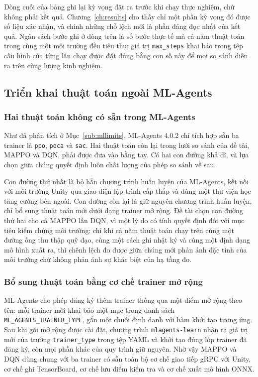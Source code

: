 \indent Dòng cuối của bảng ghi lại kỳ vọng đặt ra trước khi chạy thực nghiệm, chứ không
phải kết quả. Chương~\ref{ch:results} cho thấy chỉ một phần kỳ vọng đó được số liệu
xác nhận, và chính những chỗ lệch mới là phần đáng đọc nhất của kết quả. Ngân sách bước
ghi ở dòng trên là số bước thực tế mà cả năm thuật toán trong cùng một môi trường đều
tiêu thụ; giá trị \texttt{max\_steps} khai báo trong tệp cấu hình của từng lần chạy
được đặt đúng bằng con số này để mọi so sánh diễn ra trên cùng lượng kinh nghiệm.

\subsection{Triển khai thuật toán ngoài ML-Agents}
\label{sub:custom}

\subsubsection{Hai thuật toán không có sẵn trong ML-Agents}
\indent Như đã phân tích ở Mục~\ref{sub:mllimits}, ML-Agents 4.0.2 chỉ tích hợp sẵn ba
trainer là \texttt{ppo}, \texttt{poca} và \texttt{sac}. Hai thuật toán còn lại trong
lưới so sánh của đề tài, MAPPO và DQN, phải được đưa vào bằng tay. Có hai con đường
khả dĩ, và lựa chọn giữa chúng quyết định luôn chất lượng của phép so sánh về sau.

\indent Con đường thứ nhất là bỏ hẳn chương trình huấn luyện của ML-Agents, kết nối
với môi trường Unity qua giao diện lập trình cấp thấp và dùng một thư viện học tăng
cường bên ngoài. Con đường còn lại là giữ nguyên chương trình huấn luyện, chỉ bổ sung
thuật toán mới dưới dạng trainer mở rộng. Đề tài chọn con đường thứ hai cho cả MAPPO
lẫn DQN, vì một lý do có tính quyết định đối với mục tiêu kiểm chứng môi trường: chỉ khi
cả năm thuật toán chạy trên cùng một đường ống thu thập quỹ đạo, cùng một cách ghi nhật
ký và cùng một định dạng mô hình xuất ra, thì chênh lệch đo được giữa chúng mới phản ánh
đặc tính của môi trường chứ không phản ánh sự khác biệt của hạ tầng đo.

\subsubsection{Bổ sung thuật toán bằng cơ chế trainer mở rộng}
\label{sub:pyapi}
\indent ML-Agents cho phép đăng ký thêm trainer thông qua một điểm mở rộng theo tên:
mỗi trainer mới khai báo một mục trong danh sách \texttt{ML\_AGENTS\_TRAINER\_TYPE},
gắn một chuỗi định danh với hàm khởi tạo tương ứng. Sau khi gói mở rộng được cài đặt,
chương trình \texttt{mlagents-learn} nhận ra giá trị mới của trường
\texttt{trainer\_type} trong tệp YAML và khởi tạo đúng lớp trainer đã đăng ký, còn mọi
phần khác của quy trình giữ nguyên. Nhờ vậy MAPPO và DQN dùng chung với ba trainer có
sẵn toàn bộ cơ chế giao tiếp gRPC với Unity, cơ chế ghi TensorBoard, cơ chế lưu điểm
kiểm tra và cơ chế xuất mô hình ONNX.

